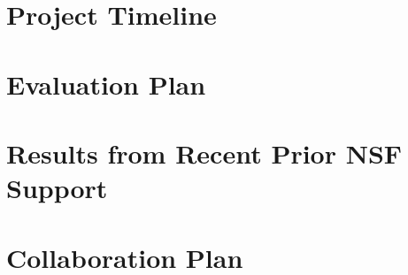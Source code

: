 


\section{Project Timeline}
\label{sec:man}




\section{Evaluation Plan}
\label{sec:eval}




\section{Results from Recent Prior NSF Support}
\label{sec:prior}

\noindent





%



\newpage
{}
\renewcommand{\thepage} {D--\arabic{page}}


\section{Collaboration Plan}
\label{sec:collab}



\newpage



\renewcommand{\thepage} {E--\arabic{page}}






